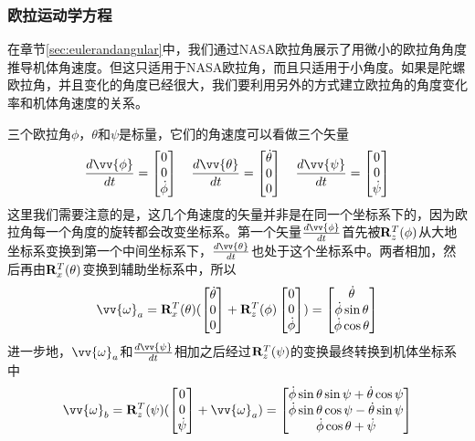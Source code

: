 \documentclass[11pt]{article}
\begin{document}
\subsubsection{欧拉运动学方程}
在章节\ref{sec:eulerandangular}中，我们通过NASA欧拉角展示了用微小的欧拉角角度推导机体角速度。但这只适用于NASA欧拉角，而且只适用于小角度。如果是陀螺欧拉角，并且变化的角度已经很大，我们要利用另外的方式建立欧拉角的角度变化率和机体角速度的关系。

三个欧拉角$\phi$，$\theta$和$\psi$是标量，它们的角速度可以看做三个矢量
$$
\frac{d\vv{\phi}}{dt} = \begin{bmatrix}0	\\	0	\\ \dot{\phi}	\end{bmatrix} \ \ \ 
\frac{d\vv{\theta}}{dt} = \begin{bmatrix}\dot{\theta}	\\0	\\0	\end{bmatrix} \ \ \ 
\frac{d\vv{\psi}}{dt} = \begin{bmatrix}0	\\	0	\\ \dot{\psi}	\end{bmatrix} 
$$
这里我们需要注意的是，这几个角速度的矢量并非是在同一个坐标系下的，因为欧拉角每一个角度的旋转都会改变坐标系。第一个矢量$\frac{d\vv{\phi}}{dt}$首先被${\bf R}_z^T(\phi)$从大地坐标系变换到第一个中间坐标系下，$\frac{d\vv{\theta}}{dt}$也处于这个坐标系中。两者相加，然后再由${\bf R}_x^T(\theta)$变换到辅助坐标系中，所以
$$
\vv{\omega}_a = {\bf R}_x^T(\theta) (\begin{bmatrix}\dot{\theta}	\\0	\\0	\end{bmatrix} + {\bf R}_z^T(\phi)\begin{bmatrix}0	\\	0	\\ \dot{\phi}	\end{bmatrix})
= \begin{bmatrix}\dot{\theta}	\\ \dot{\phi}\sin\theta	\\ \dot{\phi}\cos\theta	\end{bmatrix}
$$
进一步地，$\vv{\omega}_a$和$\frac{d\vv{\psi}}{dt}$相加之后经过${\bf R}_z^T(\psi)$的变换最终转换到机体坐标系中
$$
\vv{\omega}_b = {\bf R}_z^T(\psi)(\begin{bmatrix}0	\\	0	\\ \dot{\psi}	\end{bmatrix} + \vv{\omega}_a) = 
\begin{bmatrix}
 \dot{\phi}\sin\theta\sin\psi + \dot{\theta}\cos\psi	\\
 \dot{\phi}\sin\theta\cos\psi - \dot{\theta}\sin\psi	\\
                    \dot{\phi}\cos\theta + \dot{\psi}	\\
\end{bmatrix}
$$
\end{document}
